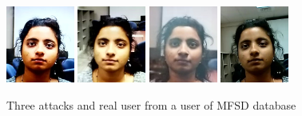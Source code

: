 \begin{figure}[htb]
\centering
\includegraphics[width=0.2\textwidth]{images_databases/MFSD/at1-2.jpg}
\includegraphics[width=0.2\textwidth]{images_databases/MFSD/at2-2.jpg}
\includegraphics[width=0.2\textwidth]{images_databases/MFSD/at3-2.jpg}
\includegraphics[width=0.2\textwidth]{images_databases/MFSD/2.jpg}
\caption{Three attacks and real user from a user of MFSD database } \label{fig:mfsd2}
\end{figure}